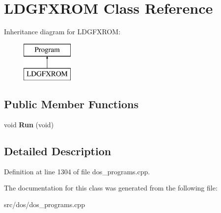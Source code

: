 \hypertarget{classLDGFXROM}{\section{L\-D\-G\-F\-X\-R\-O\-M Class Reference}
\label{classLDGFXROM}
}
Inheritance diagram for L\-D\-G\-F\-X\-R\-O\-M\-:\begin{figure}[H]
\begin{center}
\leavevmode
\includegraphics[height=2.000000cm]{classLDGFXROM}
\end{center}
\end{figure}
\subsection*{Public Member Functions}
\begin{DoxyCompactItemize}
\item 
\hypertarget{classLDGFXROM_aa4ee1bd38f082b0bb08d4fa9ed5f5626}{void {\bfseries Run} (void)}\label{classLDGFXROM_aa4ee1bd38f082b0bb08d4fa9ed5f5626}

\end{DoxyCompactItemize}


\subsection{Detailed Description}


Definition at line 1304 of file dos\-\_\-programs.\-cpp.



The documentation for this class was generated from the following file\-:\begin{DoxyCompactItemize}
\item 
src/dos/dos\-\_\-programs.\-cpp\end{DoxyCompactItemize}
